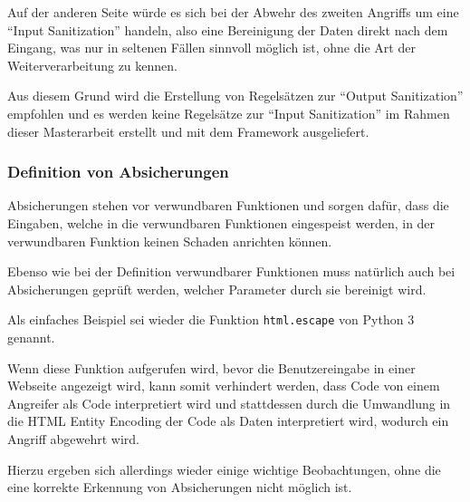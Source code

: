                 Auf der anderen Seite würde es sich bei der Abwehr des zweiten Angriffs um eine
                \foreignquote{english}{Input Sanitization} handeln,
                also eine Bereinigung der Daten direkt nach dem Eingang,
                was nur in seltenen Fällen sinnvoll möglich ist,
                ohne die Art der Weiterverarbeitung zu kennen.\cite{Seacord2015}

                Aus diesem Grund wird die Erstellung von Regelsätzen zur
                \foreignquote{english}{Output Sanitization} empfohlen und
                es werden keine Regelsätze zur
                \foreignquote{english}{Input Sanitization} im Rahmen dieser Masterarbeit erstellt und
                mit dem Framework ausgeliefert.

            \subsubsection{Definition von Absicherungen}\label{Definition von Absicherungen}
                Absicherungen stehen vor verwundbaren Funktionen und
                sorgen dafür,
                dass die Eingaben,
                welche in die verwundbaren Funktionen eingespeist werden,
                in der verwundbaren Funktion keinen Schaden anrichten können.

                Ebenso
                wie bei der Definition verwundbarer Funktionen muss natürlich auch bei Absicherungen geprüft werden,
                welcher Parameter durch sie bereinigt wird.

                Als einfaches Beispiel sei wieder die Funktion
                \lstinline{html.escape} von Python 3 genannt.

                Wenn diese Funktion aufgerufen wird,
                bevor die Benutzereingabe in einer Webseite angezeigt wird,
                kann somit verhindert werden,
                dass Code von einem Angreifer als Code interpretiert wird und
                stattdessen durch die Umwandlung in die
                \gls{HTML} Entity Encoding der Code als Daten interpretiert wird,
                wodurch ein Angriff abgewehrt wird.

                Hierzu ergeben sich allerdings wieder einige wichtige Beobachtungen,
                ohne die eine korrekte Erkennung von Absicherungen nicht möglich ist.

